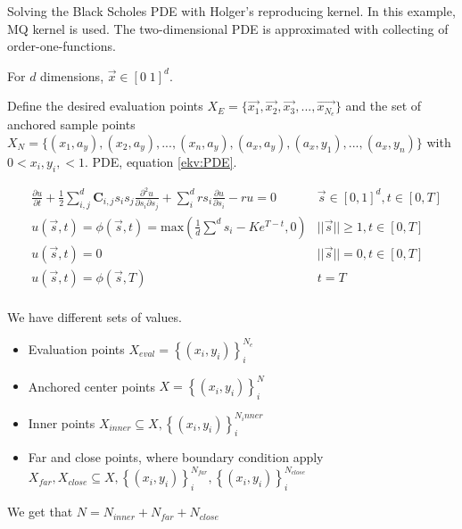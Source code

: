 \documentclass[a4paper]{article}      %
\begin{document}
Solving the Black Scholes PDE with Holger's reproducing kernel. In this example, MQ kernel is used. The two-dimensional PDE is approximated with collecting of order-one-functions. 

For $d$ dimensions, $\vec{x} \in [0\; 1]^d$.

Define the desired evaluation points $X_E = \bigl\{ \vec{x_1}, \vec{x_2}, \vec{x_3}, ..., \vec{x_{N_e}} \bigr\}$
and the set of anchored sample points  $X_N = \bigl\{ (x_1, a_y), (x_2, a_y),...,(x_n, a_y), (a_x, a_y), (a_x, y_1),...,(a_x, y_n) \bigr\}$
with $ 0 < x_i, y_i, < 1 $.
PDE, equation \ref{ekv:PDE}.

\begin{equation}
    \begin{aligned}
        &\frac{\partial u}{\partial t} + \frac{1}{2} \sum_{i, j}^d \mathbf{C}_{i,j} s_i s_j \frac{\partial^2 u}{\partial s_i \partial s_j} + \sum_{i}^d r s_i \frac{\partial u}{\partial s_i} - ru = 0 \quad &\vec{s} \in [0,1]^d, t \in [0, T] \\
        &u(\vec{s},t) = \phi(\vec{s}, t) = \mathrm{max}(\frac{1}{d}\sum^d s_i - Ke^{T-t}, 0)    &||\vec{s}|| \geq 1, t \in [0, T] \\
        &u(\vec{s}, t) = 0 &||\vec{s}|| = 0, t \in [0, T] \\
        &u(\vec{s},t) = \phi(\vec{s},T) &t = T \\
    \end{aligned}
    \label{ekv:PDE}
\end{equation}

We have different sets of values.
\begin{itemize}
\item Evaluation points  $X_{eval} = \left\{ (x_i, y_i) \right\}_i ^ {N_e}$
\item Anchored center points $X = \left\{ (x_i, y_i) \right\}_i ^ {N}$ 
\item Inner points $X_{inner}\subseteq X,\left\{ (x_i, y_i) \right\}_i ^ {N_inner}$
\item Far and close points, where boundary condition apply
$X_{far}, X_{close} \subseteq X,\left\{ (x_i, y_i) \right\}_i ^ {N_{far}}, \left\{ (x_i, y_i) \right\}_i ^ {N_{close}}$
\end{itemize}
We get that $N = N_{inner} + N_{far} + N_{close}$
\end{document}
